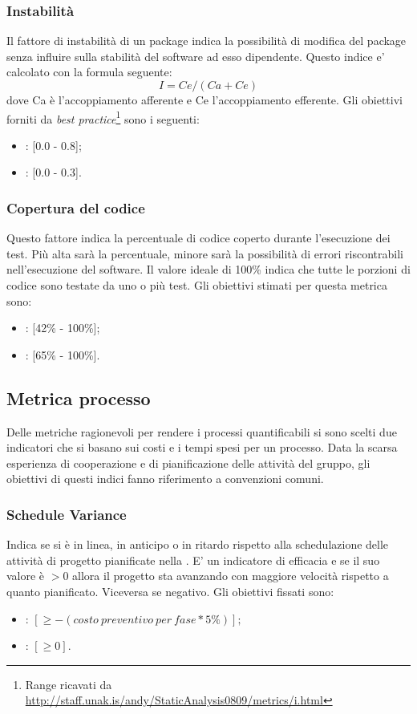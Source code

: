 \subsubsection{Instabilità}
\label{4.2.8}
Il fattore di instabilità di un package indica la possibilità di modifica del package senza influire sulla stabilità del software ad esso dipendente.
Questo indice e’ calcolato con la formula seguente:
$$I = Ce / (Ca + Ce)$$
dove Ca è l'accoppiamento afferente e Ce l'accoppiamento efferente.
Gli obiettivi forniti da \emph{best practice}\footnote{Range ricavati da \url{http://staff.unak.is/andy/StaticAnalysis0809/metrics/i.html}} sono i seguenti:
\begin{itemize}
\item {}: [0.0 - 0.8];
\item {}: [0.0 - 0.3].
\end{itemize}

\subsubsection{Copertura del codice}
\label{4.2.9}
Questo fattore indica la percentuale di codice coperto durante l'esecuzione dei test. Più alta sarà la percentuale, minore sarà la possibilità di errori riscontrabili nell'esecuzione del software. Il valore ideale di 100\% indica che tutte le porzioni di codice sono testate da uno o più test.
Gli obiettivi stimati per questa metrica sono:
\begin{itemize}
\item {}: [42\% - 100\%];
\item {}: [65\% - 100\%].
\end{itemize}


\subsection{Metrica processo} %
\label{4.3}
Delle metriche ragionevoli per rendere i processi quantificabili si sono scelti due indicatori che si basano sui costi e i tempi spesi per un processo. Data la scarsa esperienza di cooperazione e di pianificazione delle attività del gruppo, gli obiettivi di questi indici fanno riferimento a convenzioni comuni.

\subsubsection{Schedule Variance}
\label{4.3.1}
Indica se si è in linea, in anticipo o in ritardo rispetto alla schedulazione delle attività di progetto pianificate nella . E' un indicatore di efficacia e se il suo valore è $> 0$ allora il progetto sta avanzando con maggiore velocità rispetto a quanto pianificato. Viceversa se negativo.
Gli obiettivi fissati sono:
\begin{itemize}
\item {}: $ [\geq -(costo\:preventivo\:per\:fase * 5\%)]; $
\item {}: $ [\geq 0]. $
\end{itemize}

